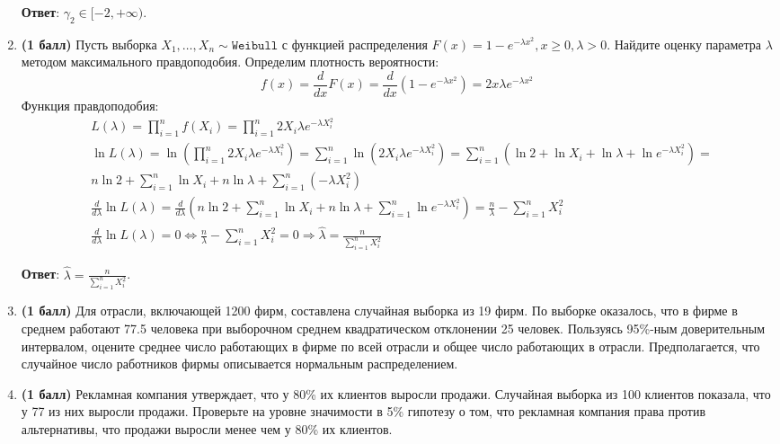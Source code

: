 \documentclass{assignment}
\begin{document}
\begin{enumerate}
    \textbf{Ответ}: $\gamma_2 \in [-2, +\infty)$.
    \finish

    \item \textbf{(1 балл)} Пусть выборка $X_1, \ldots, X_n \sim \texttt{Weibull}$ с функцией распределения $F(x) = 1 - e^{-\lambda x^2}, x \geq 0, \lambda > 0$. Найдите оценку параметра $\lambda$ методом максимального правдоподобия.
    \start
    Определим плотность вероятности:
    \begin{equation}
        f(x) = \frac{d}{dx}F(x) = \frac{d}{dx}(1 - e^{-\lambda x^2}) = 2 x \lambda e^{-\lambda x^2}
    \end{equation}
    Функция правдоподобия:
    \begin{align*}
        &L(\lambda) = \prod_{i=1}^{n}f(X_i) = \prod_{i=1}^{n}2 X_i \lambda e^{-\lambda X_i^2} \\
        &\ln L(\lambda) = \ln (\prod_{i=1}^{n}2 X_i \lambda e^{-\lambda X_i^2}) = \sum_{i=1}^{n} \ln (2 X_i \lambda e^{-\lambda X_i^2}) = \sum_{i=1}^{n} (\ln 2 + \ln X_i  + \ln \lambda + \ln e^{-\lambda X_i^2}) = \\
        &n\ln 2 + \sum_{i=1}^{n}\ln X_i  + n\ln \lambda + \sum_{i=1}^{n}(-\lambda X_i^2) \\
        &\frac{d}{d\lambda}\ln L(\lambda) = \frac{d}{d\lambda} (n\ln 2 + \sum_{i=1}^{n}\ln X_i  + n\ln \lambda + \sum_{i=1}^{n}\ln e^{-\lambda X_i^2}) = \frac{n}{\lambda} - \sum_{i=1}^{n} X_i^2 \\
        &\frac{d}{d\lambda}\ln L(\lambda) = 0 \Leftrightarrow \frac{n}{\lambda} - \sum_{i=1}^{n} X_i^2 = 0 \Rightarrow \hat{\lambda} = \frac{n}{\sum_{i=1}^{n} X_i^2}
    \end{align*}
    
    \textbf{Ответ}: $\hat{\lambda} = \frac{n}{\sum_{i=1}^{n} X_i^2}$.
    \finish

    \item \textbf{(1 балл)} Для отрасли, включающей 1200 фирм, составлена случайная выборка из 19 фирм. По выборке оказалось, что в фирме в среднем работают 77.5 человека при выборочном среднем квадратическом отклонении 25 человек. Пользуясь 95\%-ным доверительным интервалом, оцените среднее число работающих в фирме по всей отрасли и общее число работающих в отрасли. Предполагается, что случайное число работников фирмы описывается нормальным распределением.

    \item \textbf{(1 балл)} Рекламная компания утверждает, что у 80\% их клиентов выросли продажи. Случайная выборка из 100 клиентов показала, что у 77 из них выросли продажи. Проверьте на уровне значимости в 5\% гипотезу о том, что рекламная компания права против альтернативы, что продажи выросли менее чем у 80\% их клиентов.


\end{enumerate}
\end{document}
